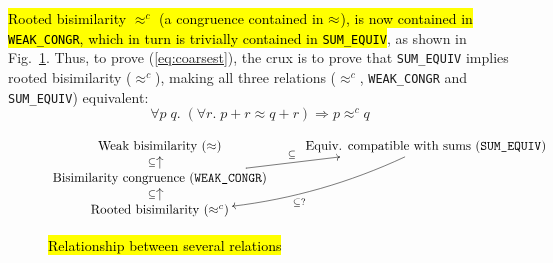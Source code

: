 %
\hl{Rooted bisimilarity $\approx^c$ (a congruence contained in
$\approx$), is now contained in \texttt{WEAK_CONGR},
which in turn is trivially contained in \texttt{SUM_EQUIV}}, as shown
in Fig.~\ref{fig:relationship}. Thus, to prove (\ref{eq:coarsest}),
the crux is to prove that \texttt{SUM_EQUIV} implies
rooted bisimilarity ($\approx^c$), making all three relations
($\approx^c$, \texttt{WEAK_CONGR} and \texttt{SUM_EQUIV}) equivalent:
\begin{equation}
\label{equa:pq}
\forall p\; q.\; ( \forall r.\; p+r \approx q+r ) \Rightarrow p \approx^c\! q  
\end{equation}

\begin{figure}[ht]
\begin{displaymath}
\xymatrix@R=2ex{
{\textrm{Weak bisimilarity } (\approx)} & {\textrm{Equiv.
    compatible with sums (\texttt{SUM\_EQUIV})}} \ar@/^3ex/[ldd]^{\subseteq ?}\\
{\textrm{Bisimilarity congruence (\texttt{WEAK\_CONGR})}}
\ar[u]^{\subseteq} \ar[ru]^{\subseteq} \\
{\textrm{Rooted bisimilarity } (\approx^c)} \ar[u]^{\subseteq}
}
\end{displaymath}
\vspace{-2ex}
\caption{\hl{Relationship between several relations}}
\label{fig:relationship}
\end{figure}

